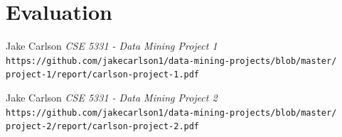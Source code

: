 \documentclass{article}
\begin{document}
\section{Evaluation}

\begin{thebibliography}{10}
    Jake Carlson
    \textit{CSE 5331 - Data Mining Project 1}
    \texttt{https://github.com/jakecarlson1/data-mining-projects/blob/master/}
    \texttt{project-1/report/carlson-project-1.pdf}

    Jake Carlson
    \textit{CSE 5331 - Data Mining Project 2}
    \texttt{https://github.com/jakecarlson1/data-mining-projects/blob/master/}
    \texttt{project-2/report/carlson-project-2.pdf}

\end{thebibliography}
\end{document}
